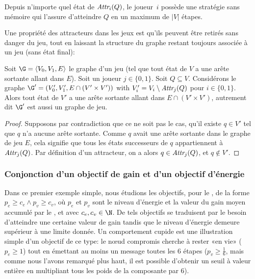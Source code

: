 \begin{lemma}
Depuis n'importe quel état de $\textit{Attr}_{i}(Q)$, le joueur~$i$ possède une stratégie sans mémoire qui l'assure d'atteindre $Q$ en un maximum de $|V|$ étapes.
\end{lemma}

Une propriété des attracteurs dans les jeux est qu'ils peuvent être retirés sans danger du jeu, tout en laissant la structure du graphe restant toujours associée à un jeu (\cad sans état final):
\begin{lemma}\label{tj:lem:removeattr}
Soit $\G = \langle V_0, V_1, E\rangle$ le graphe d'un jeu (\cad tel que tout état de $V$ a une arête sortante allant dans $E$).
Soit un joueur $j \in \{0,1\}$.
Soit $Q \subseteq V$.
Considérons le graphe $\G' = (V_0', V_1', E \cap (V' \times V'))$ with $V_i' = V_i \setminus \textit{Attr}_{j}(Q)$ pour $i \in \{0,1\}$.
Alors tout état de $V'$ a une arête sortante allant dans $E \cap (V' \times V')$, autrement dit $\G'$ est aussi un graphe de jeu.
\end{lemma}

\begin{proof}
Supposons par contradiction que ce ne soit pas le cas, \cad qu'il existe $q \in V'$ tel que $q$ n'a aucune arête sortante.
Comme $q$ avait une arête sortante dans le graphe de jeu $E$, cela signifie que tous les états successeurs de $q$ appartiennent à $\textit{Attr}_{j}(Q)$.
Par définition d'un attracteur, on a alors $q \in \textit{Attr}_{j}(Q)$, et $q \notin V'$.
\end{proof}

\subsubsection{Conjonction d'un objectif de gain et d'un objectif d'énergie}

Dans ce premier exemple simple, nous étudions les objectifs, pour le \jo, de la forme $p_e \geq c_e \wedge p_v \geq c_v$, où $p_e$ et $p_v$ sont le niveau d'énergie et la valeur du gain moyen accumulé par le \jo, et avec $c_e,c_v \in \N$.
De tels objectifs se traduisent par le besoin d'atteindre une certaine valeur de gain tandis que le niveau d'énergie demeure supérieur à une limite donnée.
Un comportement cupide est une illustration simple d'un objectif de ce type: le nœud compromis cherche à rester «en vie» ($p_e \geq 1$) tout en émettant au moins un message toutes les $6$ étapes ($p_v \geq \frac1{6}$, mais comme nous l'avons remarqué plus haut, il est possible d'obtenir un seuil à valeur entière en multipliant tous les poids de la composante par $6$).

